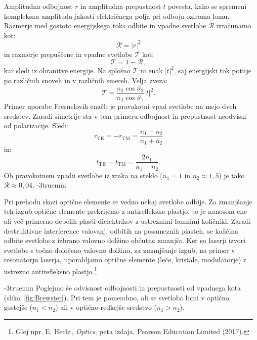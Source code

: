 Amplitudna odbojnost $r$ in amplitudna prepustnost $t$ povesta, kako se spremeni 
kompleksna amplituda jakosti električnega polja pri odboju oziroma lomu.
Razmerje med gostoto energijskega toka odbite in vpadne svetlobe $\mathcal{R}$ 
izračunamo kot:
\begin{equation}
\mathcal{R}=\left|r\right|^{2}
\end{equation}
in razmerje prepuščene in vpadne svetlobe $\mathcal{T}$ kot:
\begin{equation}
\mathcal{T}=1-\mathcal{R},
\end{equation}
kar sledi iz ohranitve energije. Na splošno $\mathcal{T}$
ni enak $\left|t\right|^{2}$, saj energijski tok potuje po različnih
snoveh in v različnih smereh. Velja zveza:
\begin{equation}
\mathcal{T}=\frac{n_{2}\cos\vartheta_{2}}{n_{1}\cos\vartheta_{1}}\left|t\right|^{2}\!\!.
\end{equation}
Primer uporabe Fresnelovih enačb je pravokotni vpad svetlobe na mejo dveh sredstev. 
Zaradi simetrije sta v tem primeru odbojnost in prepustnost neodvisni od polarizacije. Sledi:
\begin{equation}
r_{\mathrm{TE}} = -r_{\mathrm{TM}} = \frac{n_1-n_2}{n_1+n_2}
\end{equation}
in:
\begin{equation}
t_{\mathrm{TE}} = t_{\mathrm{TM}} = \frac{2n_1}{n_1+n_2}. 
\end{equation}
Ob pravokotnem vpadu svetlobe iz zraka na steklo ($n_1 = 1$ in $n_2 \approx 1,5$) je tako
$\mathcal{R} \approx 0,04$.
\vglue-3truemm
\begin{remark}
Pri prehodu skozi optične elemente se vedno nekaj
svetlobe odbije. Za zmanjšanje teh izgub optične elemente
prekrijemo z antirefleksno plastjo, to je nanosom ene ali več primerno
debelih plasti dielektrikov z ustreznimi lomnimi količniki.
Zaradi destruktivne interference valovanj, odbitih na posameznih plasteh,
se količina odbite svetlobe z izbrano valovno dolžino občutno zmanjša. Ker so laserji
izvori svetlobe s točno določeno valovno dolžino, za zmanjšanje
izgub, na primer v resonatorju laserja, uporabljamo optične
elemente (leče, kristale, modulatorje) z ustrezno antirefleksno plastjo.\footnote{Glej npr. 
E. Hecht, {\it Optics}, peta izdaja, Pearson Education Limited (2017).}
\end{remark}
\vglue-3truemm
Poglejmo še odvisnost odbojnosti in prepustnosti od vpadnega kota (slika~\ref{fig:Brewster}). 
Pri tem je pomembno, ali se svetloba lomi v optično gostejše ($n_1<n_2$) ali v optično
redkejše sredstvo ($n_1>n_2$). 

